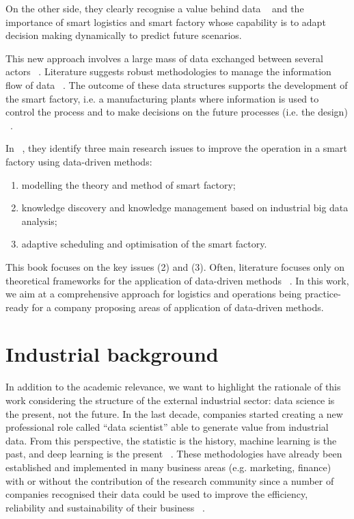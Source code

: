 On the other side, they clearly recognise a value behind data ~\cite{Balandin2015, Uckelmann2008} and the importance of smart logistics and smart factory whose capability is to adapt decision making dynamically to predict future scenarios.\par

This new approach involves a large mass of data exchanged between several actors ~\cite{Kawa2012, Singh2017}. Literature suggests robust methodologies to manage the information flow of data ~\cite{Tran-Dang2018}. The outcome of these data structures supports the development of the smart factory, i.e. a manufacturing plants where information is used to control the process and to make decisions on the future processes (i.e. the design) ~\cite{Hajdul2011}. \par

In ~\cite{TAN2018}, they identify three main research issues to improve the operation in a smart factory using data-driven methods:

\begin{enumerate}
    \item modelling the theory and method of smart factory;
    \item knowledge discovery and knowledge management based on industrial big data analysis;
    \item adaptive scheduling and optimisation of the smart factory.

\end{enumerate}

This book focuses on the key issues (2) and (3). Often, literature focuses only on theoretical frameworks for the application of data-driven methods ~\cite{DaSilva2019}. In this work, we aim at a comprehensive approach for logistics and operations being practice-ready for a company proposing areas of application of data-driven methods.

\section{Industrial background}
In addition to the academic relevance, we want to highlight the rationale of this work considering the structure of the external industrial sector: data science is the present, not the future. In the last decade, companies started creating a new professional role called “data scientist” able to generate value from industrial data. From this perspective, the statistic is the history, machine learning is the past, and deep learning is the present ~\cite{HubSpot2016}. These methodologies have already been established and implemented in many business areas (e.g. marketing, finance) with or without the contribution of the research community since a number of companies recognised their data could be used to improve the efficiency, reliability and sustainability of their business ~\cite{Nascimento2019, Trkman2010}.\par

